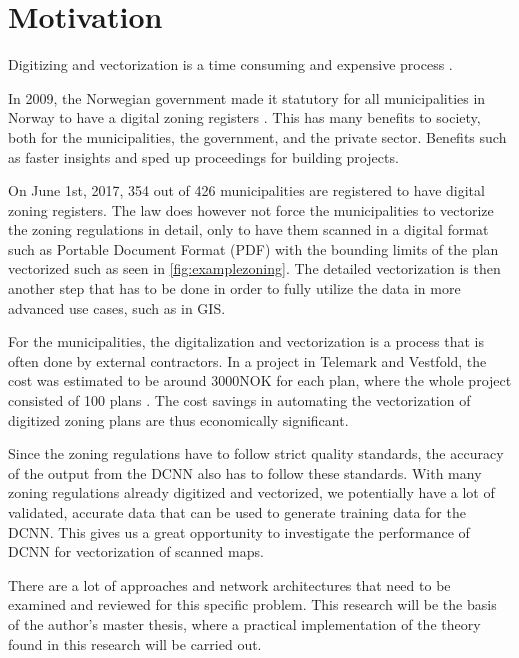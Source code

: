 \chapter{Motivation}\label{chp:motivation}
Digitizing and vectorization is a time consuming and expensive process \cite{Worboys2003}.

In 2009, the Norwegian government made it statutory for all municipalities in Norway to have a digital zoning registers \cite{Kommunaltplanregister2009}. This has many benefits to society, both for the municipalities, the government, and the private sector. Benefits such as faster insights and sped up proceedings for building projects. 

On June 1st, 2017, 354 out of 426 municipalities are registered to have digital zoning registers. The law does however not force the municipalities to vectorize the zoning regulations in detail, only to have them scanned in a digital format such as Portable Document Format (PDF) with the bounding limits of the plan vectorized such as seen in \autoref{fig:examplezoning}. The detailed vectorization is then another step that has to be done in order to fully utilize the data in more advanced use cases, such as in GIS.

For the municipalities, the digitalization and vectorization is a process that is often done by external contractors. In a project in Telemark and Vestfold, the cost was estimated to be around 3000NOK for each plan, where the whole project consisted of 100 plans \cite{Bo2009}. The cost savings in automating the vectorization of digitized zoning plans are thus economically significant. 

Since the zoning regulations have to follow strict quality standards, the accuracy of the output from the DCNN also has to follow these standards. With many zoning regulations already digitized and vectorized, we potentially have a lot of validated, accurate data that can be used to generate training data for the DCNN. This gives us a great opportunity to investigate the performance of DCNN for vectorization of scanned maps. 

There are a lot of approaches and network architectures that need to be examined and reviewed for this specific problem. This research will be the basis of the author's master thesis, where a practical implementation of the theory found in this research will be carried out. 

